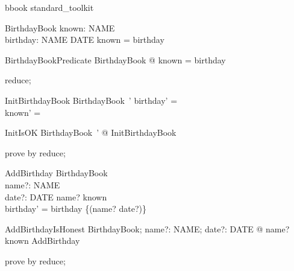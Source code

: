 
\begin{zsection}
   \SECTION  bbook \parents standard\_toolkit
\end{zsection}

\begin{zed}
\end{zed}

\begin{schema}{BirthdayBook}
  known: \power NAME \\
  birthday: NAME \pfun DATE
\where
  known = \dom  birthday
\end{schema}

\begin{theorem}{BirthdayBookPredicate}
\forall BirthdayBook @ known = \dom birthday
\end{theorem}

\begin{zproof}[BirthdayBookPredicate]
reduce;
\end{zproof}

\begin{schema}{InitBirthdayBook}
  BirthdayBook~'
\where
  birthday' = \emptyset\\
  known' = \emptyset
\end{schema}

\begin{theorem}{InitIsOK}
\exists  BirthdayBook~' @ InitBirthdayBook
\end{theorem}

\begin{zproof}[InitIsOK]
prove by reduce;
\end{zproof}

\begin{schema}{AddBirthday}
  \Delta BirthdayBook\\
  name?: NAME\\
  date?: DATE
\where
  name? \notin  known\\
  birthday' = birthday \cup  \{(name? \mapsto  date?)\}
\end{schema}

\begin{theorem}{AddBirthdayIsHonest}
\forall  BirthdayBook; name?: NAME; date?: DATE @ name? \notin  known \implies  \pre  AddBirthday
\end{theorem}

\begin{zproof}[AddBirthdayIsHonest]
prove by reduce;
\end{zproof}

